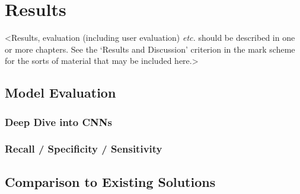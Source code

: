 \chapter{Results}
\label{chapter3}

<Results, evaluation (including user evaluation) {\em etc.} should be described in one or more chapters. See the `Results and Discussion' criterion in the mark scheme for the sorts of material that may be included here.>

\section{Model Evaluation}
\lipsum[8]

\subsection{Deep Dive into CNNs}
\lipsum[6]

\subsection{Recall / Specificity / Sensitivity}
\lipsum[6]


\section{Comparison to Existing Solutions}
\lipsum[12]
